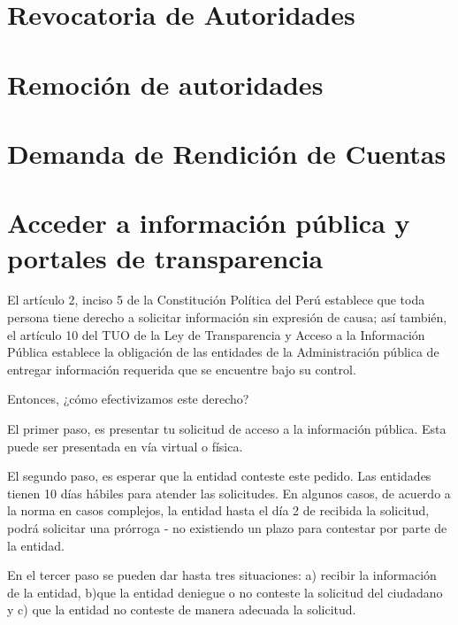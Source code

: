 \documentclass[
]{book}
\begin{document}
\hypertarget{revocatoria-de-autoridades}{%
\section{Revocatoria de Autoridades}\label{revocatoria-de-autoridades}}

\hypertarget{remociuxf3n-de-autoridades}{%
\section{Remoción de autoridades}\label{remociuxf3n-de-autoridades}}

\hypertarget{demanda-de-rendiciuxf3n-de-cuentas}{%
\section{Demanda de Rendición de Cuentas}\label{demanda-de-rendiciuxf3n-de-cuentas}}

\hypertarget{acceder-a-informaciuxf3n-puxfablica-y-portales-de-transparencia}{%
\section{Acceder a información pública y portales de transparencia}\label{acceder-a-informaciuxf3n-puxfablica-y-portales-de-transparencia}}

El artículo 2, inciso 5 de la Constitución Política del Perú establece que toda persona tiene derecho a solicitar información sin expresión de causa; así también,
el artículo 10 del TUO de la Ley de Transparencia y Acceso a la Información Pública establece la obligación de las entidades de la Administración pública de entregar información requerida que se encuentre bajo su control.

Entonces, ¿cómo efectivizamos este derecho?

El primer paso, es presentar tu solicitud de acceso a la información pública. Esta puede ser presentada en vía virtual o física.

El segundo paso, es esperar que la entidad conteste este pedido. Las entidades tienen 10 días hábiles para atender las solicitudes. En algunos casos, de acuerdo a la norma en casos complejos, la entidad hasta el día 2 de recibida la solicitud, podrá solicitar una prórroga - no existiendo un plazo para contestar por parte de la entidad.

En el tercer paso se pueden dar hasta tres situaciones: a) recibir la información de la entidad, b)que la entidad deniegue o no conteste la solicitud del ciudadano y c) que la entidad no conteste de manera adecuada la solicitud.
\end{document}
